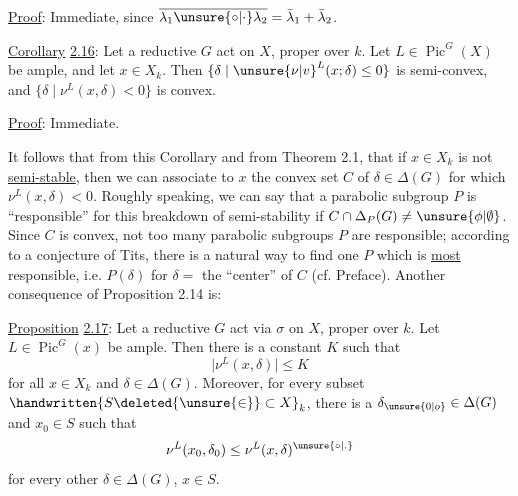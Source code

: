 
\uline{Proof}: Immediate, since $\overline{\lambda_1\unsure{\circ|\cdot}\lambda_2}=\bar{\lambda}_1+\bar{\lambda}_2$.

\uline{Corollary} \uline{2.16}: Let a reductive $G$ act on $X$, proper over $k$. Let $L\in\operatorname{Pic}^{G}(X)$ be ample, and let $x\in X_k$. Then $\{\delta\mid \unsure{\nu|v}^{L}(x;\delta)\leq 0\}$ is semi-convex, and $\{\delta\mid \nu^{L}(x,\delta)<0\}$ is convex.

\uline{Proof}: Immediate.

It follows that from this Corollary and from Theorem 2.1, that if \deleted{\unsure{$($}}$x\in X_k$ is not \uline{semi-stable}, then we can associate to $x$ the convex set $C$ of $\delta\in\Delta(G)$ for which $\nu^{L}(x,\delta)<0$. Roughly speaking, we can say that a parabolic subgroup $P$ is ``responsible'' for this breakdown of semi-stability if $C\cap\Delta_P(G)\neq\unsure{\phi|\emptyset}$. Since $C$ is convex, not too many parabolic subgroups $P$ are responsible; according to a conjecture of Tits, there is  a natural way to find one $P$ which is \uline{most} responsible, i.e. $P(\delta)$ for $\delta=$ the ``center'' of $C$ (cf. Preface). Another consequence of Proposition 2.14 is:

\uline{Proposition} \uline{2.17}: Let a reductive $G$ act via $\sigma$ on $X$, proper over $k$. Let $L\in\operatorname{Pic}^{G}(x)$ be ample. Then there is a constant $K$ such that
\[
 \lvert\nu^{L}(x,\delta)\rvert\leq K
\]
for all $x\in X_k$ and $\delta\in\Delta(G)$. Moreover, for every subset $\handwritten{S\deleted{\unsure{\in}}\subset X}_k$, there is a $\delta_{\unsure{0|o}}\in\Delta(G)$ and $x_0\in S$ such that
\[
 \nu^{L}(x_0,\delta_0)\leq\nu^{L}(x,\delta)^{\unsure{\circ|.}}
\]
for every other $\delta\in\Delta(G)$, $x\in S$.
